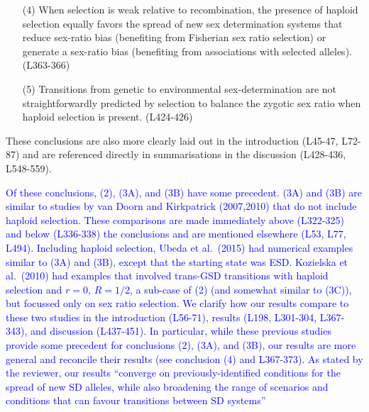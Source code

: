 \documentclass[10pt,letterpaper]{article}
\begin{document}
{\begin{enumerate}
\item[(4)] When selection is weak relative to recombination, the presence of haploid selection equally favors the spread of new sex determination systems that reduce sex-ratio bias (benefiting from Fisherian sex ratio selection) or generate a sex-ratio bias (benefiting from associations with selected alleles). (L363-366)
\item[(5)] Transitions from genetic to environmental sex-determination are not straightforwardly predicted by selection to balance the zygotic sex ratio when haploid selection is present.  (L424-426)
\end{enumerate}
These conclusions are also more clearly laid out in the introduction (L45-47, L72-87) and are referenced directly in summarisations in the discussion (L428-436, L548-559). 
}

\textcolor{blue}{Of these conclusions, (2), (3A), and (3B) have some precedent. 
(3A) and (3B) are similar to studies by van Doorn and Kirkpatrick (2007,2010) that do not include haploid selection. These comparisons are made immediately above (L322-325) and below (L336-338) the conclusions and are mentioned elsewhere (L53, L77, L494). 
Including haploid selection, Ubeda et al.\ (2015) had numerical examples similar to (3A) and (3B), except that the starting state was ESD. 
Kozielska et al.\ (2010) had examples that involved trans-GSD transitions with haploid selection and $r=0$, $R=1/2$, a sub-case of (2) (and somewhat similar to (3C)), but focussed only on sex ratio selection. 
We clarify how our results compare to these two studies in the introduction (L56-71), results (L198, L301-304, L367-343), and discussion (L437-451).
In particular, while these previous studies provide some precedent for conclusions (2), (3A), and (3B), our results are more general and reconcile their results (see conclusion (4) and L367-373). 
As stated by the reviewer, our results ``converge on previously-identified conditions for the spread of new SD alleles, while also broadening the range of scenarios and conditions that can favour transitions between SD systems''}
\end{document}
